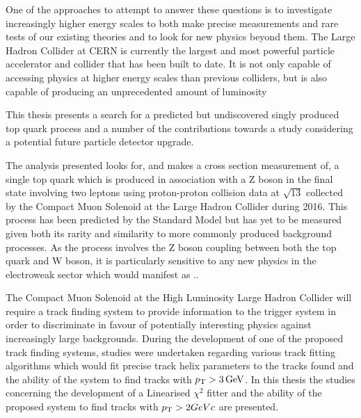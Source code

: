 One of the approaches to attempt to answer these questions is to investigate increasingly higher energy scales to both make precise measurements and rare tests of our existing theories and to look for new physics beyond them.
The Large Hadron Collider at CERN is currently the largest and most powerful particle accelerator and collider that has been built to date.
It is not only capable of accessing physics at higher energy scales than previous colliders, but is also capable of producing an unprecedented amount of luminosity



This thesis presents a search for a predicted but undiscovered singly produced top quark process and a number of the contributions towards a study considering a potential future particle detector upgrade.

The analysis presented looks for, and makes a cross section measurement of, a single top quark which is produced in association with a Z boson in the final state involving two leptons using proton-proton collision data at $\sqrt{13}$ collected by the Compact Muon Solenoid at the Large Hadron Collider during 2016.
This process has been predicted by the Standard Model but has yet to be measured given both its rarity and similarity to more commonly produced background processes.
As the process involves the Z boson coupling between both the top quark and W boson, it is particularly sensitive to any new physics in the electroweak sector which would manifest as ..

The Compact Muon Solenoid at the High Luminosity Large Hadron Collider will require a track finding system to provide information to the trigger system in order to discriminate in favour of potentially interesting physics against increasingly large backgrounds.
During the development of one of the proposed track finding systems, studies were undertaken regarding various track fitting algorithms which would fit precise track helix parameters to the tracks found and the ability of the system to find tracks with $p_{\mathrm{T}} > 3\,\text{Ge\hspace{-.08em}V}$.
In this thesis the studies concerning the development of a Linearised $\chi^{2}$ fitter and the ability of the proposed system to find tracks with $p_{\mathrm{T}} > 2GeVc$ are presented.



